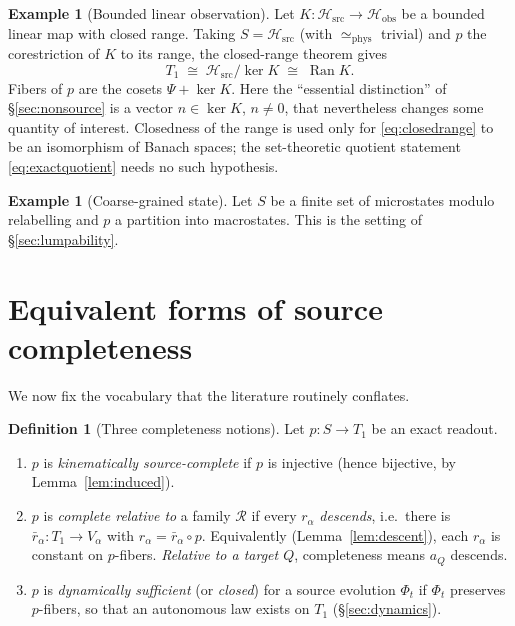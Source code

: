 \documentclass[11pt,reqno]{amsart}
\theoremstyle{plain}
\theoremstyle{definition}
\newtheorem{definition}[theorem]{Definition}
\newtheorem{example}[theorem]{Example}
\theoremstyle{remark}
\DeclareMathOperator{\Ran}{Ran}
\newcommand{\Hsrc}{\mathcal{H}_{\mathrm{src}}}
\newcommand{\Hobs}{\mathcal{H}_{\mathrm{obs}}}
\begin{document}
\begin{example}[Bounded linear observation]\label{ex:linear}
Let $K\colon\Hsrc\to\Hobs$ be a bounded linear map with closed range. Taking $S=\Hsrc$ (with $\simeq_{\mathrm{phys}}$ trivial) and $p$ the corestriction of $K$ to its range, the closed-range theorem gives
\begin{equation}\label{eq:closedrange}
T_1\;\cong\;\Hsrc/\ker K\;\cong\;\Ran K .
\end{equation}
Fibers of $p$ are the cosets $\Psi+\ker K$. Here the ``essential distinction'' of \S\ref{sec:nonsource} is a vector $n\in\ker K$, $n\neq 0$, that nevertheless changes some quantity of interest. Closedness of the range is used only for \eqref{eq:closedrange} to be an isomorphism of Banach spaces; the set-theoretic quotient statement \eqref{eq:exactquotient} needs no such hypothesis.
\end{example}

\begin{example}[Coarse-grained state]\label{ex:coarse}
Let $S$ be a finite set of microstates modulo relabelling and $p$ a partition into macrostates. This is the setting of \S\ref{sec:lumpability}.
\end{example}

\section{Equivalent forms of source completeness}\label{sec:completeness}

We now fix the vocabulary that the literature routinely conflates.

\begin{definition}[Three completeness notions]\label{def:completeness}
Let $p\colon S\to T_1$ be an exact readout.
\begin{enumerate}
\item $p$ is \emph{kinematically source-complete} if $p$ is injective (hence bijective, by Lemma~\ref{lem:induced}).
\item $p$ is \emph{complete relative to} a family $\mathcal R$ if every $r_\alpha$ \emph{descends}, i.e.\ there is $\bar r_\alpha\colon T_1\to V_\alpha$ with $r_\alpha=\bar r_\alpha\circ p$. Equivalently (Lemma~\ref{lem:descent}), each $r_\alpha$ is constant on $p$-fibers. \emph{Relative to a target $Q$}, completeness means $a_Q$ descends.
\item $p$ is \emph{dynamically sufficient} (or \emph{closed}) for a source evolution $\Phi_t$ if $\Phi_t$ preserves $p$-fibers, so that an autonomous law exists on $T_1$ (\S\ref{sec:dynamics}).
\end{enumerate}
\end{definition}
\end{document}
